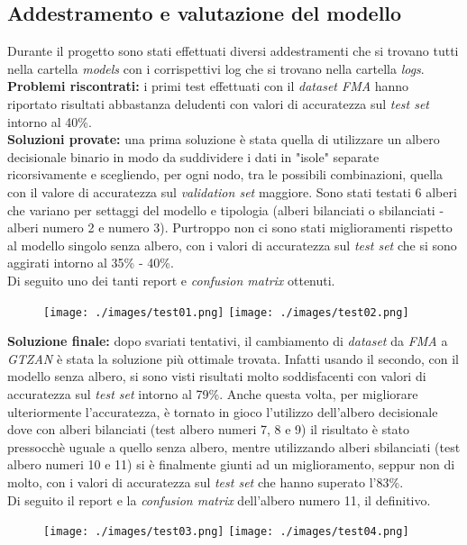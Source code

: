 \subsection{Addestramento e valutazione del modello}
Durante il progetto sono stati effettuati diversi addestramenti che si trovano tutti nella cartella \textit{models} con i corrispettivi log che si trovano nella cartella \textit{logs}.\\
\newline
\textbf{Problemi riscontrati:} i primi test effettuati con il \textit{dataset FMA} hanno riportato risultati abbastanza deludenti con valori di accuratezza sul \textit{test set} intorno al 40\%.\\
\newline
\textbf{Soluzioni provate:} una prima soluzione è stata quella di utilizzare un albero decisionale binario in modo da suddividere i dati in "isole" separate ricorsivamente e scegliendo, per ogni nodo, tra le possibili combinazioni, quella con il valore di accuratezza sul \textit{validation set} maggiore. Sono stati testati 6 alberi che variano per settaggi del modello e tipologia (alberi bilanciati o sbilanciati - alberi numero 2 e numero 3). Purtroppo non ci sono stati miglioramenti rispetto al modello singolo senza albero, con i valori di accuratezza sul \textit{test set} che si sono aggirati intorno al 35\% - 40\%.\\
\newline Di seguito uno dei tanti report e \textit{confusion matrix} ottenuti.
\begin{figure}[H]
	\centering
	\texttt{[image: ./images/test01.png]}
	\texttt{[image: ./images/test02.png]}
\end{figure}

\noindent \textbf{Soluzione finale:} dopo svariati tentativi, il cambiamento di \textit{dataset} da \textit{FMA} a \textit{GTZAN} è stata la soluzione più ottimale trovata. Infatti usando il secondo, con il modello senza albero, si sono visti risultati molto soddisfacenti con valori di accuratezza sul \textit{test set} intorno al 79\%. Anche questa volta, per migliorare ulteriormente l'accuratezza, è tornato in gioco l'utilizzo dell'albero decisionale dove con alberi bilanciati (test albero numeri 7, 8 e 9) il risultato è stato pressocchè uguale a quello senza albero, mentre utilizzando alberi sbilanciati (test albero numeri 10 e 11) si è finalmente giunti ad un miglioramento, seppur non di molto, con i valori di accuratezza sul \textit{test set} che hanno superato l'83\%.\\
\newline Di seguito il report e la \textit{confusion matrix} dell'albero numero 11, il definitivo.
\begin{figure}[H]
	\centering
	\texttt{[image: ./images/test03.png]}
	\texttt{[image: ./images/test04.png]}
\end{figure}

